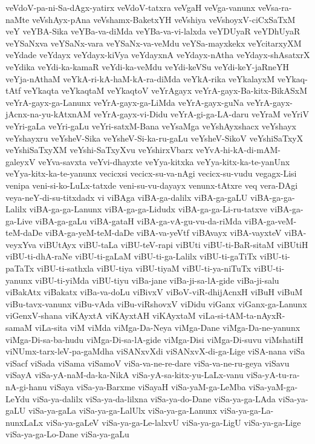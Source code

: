 {veVdoV-pa-ni-Sa-dAgx-yatirx
veVdoV-tatxra
veVgaH
veVga-vanunx
veVsa-ra-naMte
veVshAyx-pAna
veVshamx-BaketxYH
veVshiya
veVshoyxV-ciCxSaTxM
veY
veYBA-Sika
veYBa-va-diMda
veYBa-va-vi-lalxda
veYDUyaR
veYDhUyaR
veYSaNxva
veYSaNx-vara
veYSaNx-va-veMdu
veYSa-mayxkekx
veYcitarxyXM
veYdade
veYdayx
veYdayx-kiVya
veYdayxnA
veYdayx-nAtha
veYdayx-shAsatxrX
veYdika
veYdi-ka-kamaR
veYdi-ka-veMdu
veYdi-keVSu
veYdi-keY-jaRneYH
veYja-nAthaM
veYkA-ri-kA-haM-kA-ra-diMda
veYkA-rika
veYkalayxM
veYkaq-tAtf
veYkaqta
veYkaqtaM
veYkaqtoV
veYrAgayx
veYrA-gayx-Ba-kitx-BikASxM
veYrA-gayx-ga-Lanunx
veYrA-gayx-ga-LiMda
veYrA-gayx-guNa
veYrA-gayx-jAcnx-na-yu-kAtxnAM
veYrA-gayx-vi-Didu
veYrA-gi-ga-LA-daru
veYraM
veYriV
veYri-gaLa
veYri-gaLu
veYri-satxM-Bana
veYsaMga
veYshAyxshacx
veYshayx
veYshayxru
veYsheV-Sika
veYsheV-Si-ka-ru-gaLu
veYsheV-SikoV
veYshiSaTxyX
veYshiSaTxyXM
veYshi-SaTxyXvu
veYshirxVbarx
veYvA-hi-kA-di-mAM-galeyxV
veYva-savxta
veYvi-dhayxte
veYya-kitxka
veYya-kitx-ka-te-yanUnx
veYya-kitx-ka-te-yanunx
vecicxsi
vecicx-su-va-nAgi
vecicx-su-vudu
vegagx-Lisi
venipa
veni-si-ko-LuLx-tatxde
veni-su-vu-dayayx
venunx-tAtxre
veq
vera-DAgi
veya-neY-di-su-titxdadx
vi
viBAga
viBA-ga-dalilx
viBA-ga-gaLU
viBA-ga-ga-Lalilx
viBA-ga-ga-Lanunx
viBA-ga-ga-Lidudx
viBA-ga-ga-Li-ru-tatxve
viBA-ga-ga-Live
viBA-ga-gaLu
viBA-gataH
viBA-ga-vA-gu-vu-da-riMda
viBA-ga-veM-teM-daDe
viBA-ga-yeM-teM-daDe
viBA-va-yeVtf
viBAvayx
viBA-vayxteV
viBA-veyxYva
viBUtAyx
viBU-taLa
viBU-teV-rapi
viBUti
viBU-ti-BaR-sitaM
viBUtiH
viBU-ti-dhA-raNe
viBU-ti-gaLaM
viBU-ti-ga-Lalilx
viBU-ti-gaTiTx
viBU-ti-paTaTx
viBU-ti-sathxla
viBU-tiya
viBU-tiyaM
viBU-ti-ya-niTuTx
viBU-ti-yanunx
viBU-ti-yiMda
viBU-tiyu
viBa-jane
viBa-ji-sa-lA-gide
viBa-ji-salu
viBakAtx
viBakatx
viBa-va-doLu
viBivxV
viBoV-viR-dhijAcnxH
viBuH
viBuM
viBu-tavx-vanunx
viBu-vAda
viBu-viRshovxV
viDidu
viGanx
viGanx-ga-Lanunx
viGenxV-shana
viKAyxtA
viKAyxtAH
viKAyxtaM
viLa-si-tAM-ta-nAyxR-samaM
viLa-sita
viM
viMda
viMga-Da-Neya
viMga-Dane
viMga-Da-ne-yanunx
viMga-Di-sa-ba-hudu
viMga-Di-sa-lA-gide
viMga-Disi
viMga-Di-suvu
viMshatiH
viNUmx-tarx-leV-pa-gaMdha
viSANxvXdi
viSANxvX-di-ga-Lige
viSA-nana
viSa
viSacf
viSada
viSama
viSamoV
viSa-va-ne-re-dare
viSa-va-ne-ru-geya
viSavu
viSayA
viSa-yA-naM-da-ka-NikA
viSa-yA-sa-kitx-yu-LaLx-vanu
viSa-yA-tu-ra-nA-gi-hanu
viSaya
viSa-ya-Barxme
viSayaH
viSa-yaM-ga-LeMba
viSa-yaM-ga-LeYdu
viSa-ya-dalilx
viSa-ya-da-lilxna
viSa-ya-do-Dane
viSa-ya-ga-LAda
viSa-ya-gaLU
viSa-ya-gaLa
viSa-ya-ga-LalUlx
viSa-ya-ga-Lanunx
viSa-ya-ga-La-nunxLaLx
viSa-ya-gaLeV
viSa-ya-ga-Le-lalxvU
viSa-ya-ga-LigU
viSa-ya-ga-Lige
viSa-ya-ga-Lo-Dane
viSa-ya-gaLu
}
